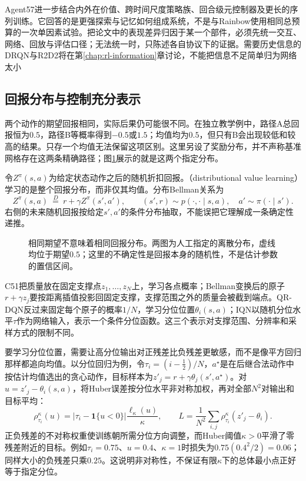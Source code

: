 Agent57进一步结合内外在价值、跨时间尺度策略族、回合级元控制器及更长的序列训练。它回答的是更强探索与记忆如何组成系统，不是与Rainbow使用相同总预算的一次单因素试验。把论文中的表现差异归因于某一个部件，必须先统一交互、网络、回放与评估口径；无法统一时，只陈述各自协议下的证据。需要历史信息的DRQN与R2D2将在第\ref{chap:rl-information}章讨论，不能把信息不足简单归为网络太小

\subsection{回报分布与控制充分表示}
\label{sec:rl-learning-distributional}

两个动作的期望回报相同，实际后果仍可能很不同。在独立教学例中，路径A总回报恒为$0.5$，路径B等概率得到$-0.5$或$1.5$；均值均为$0.5$，但只有B会出现较低和较高的结果。只存一个均值无法保留这项区别。这里另设了奖励分布，并不声称基准网格存在这两条精确路径；图\ref{fig:rl-learning-return-distributions}展示的就是这两个指定分布。

令$Z^\pi(s,a)$为给定状态动作之后的随机折扣回报。（distributional value learning）学习的是整个回报分布，而非仅其均值。分布Bellman关系为
\begin{equation}
  Z^\pi(s,a)\ \overset{D}{=}\ %
    r+\gamma Z^\pi(s',a'),\qquad
  (s',r)\sim p(\cdot,\cdot\mid s,a),\quad a'\sim\pi(\cdot\mid s').
  \label{eq:rl-learning-distributional-bellman}
\end{equation}
右侧的未来随机回报按给定$s',a'$的条件分布抽取，不能误把它理解成一条确定性递推。

\begin{figure}[htbp]
  \centering
  
  \caption{相同期望不意味着相同回报分布。两图为人工指定的离散分布，虚线均位于期望$0.5$；这里的不确定性是回报本身的随机性，不是估计参数的置信区间。}
  \label{fig:rl-learning-return-distributions}
\end{figure}

C51把质量放在固定支撑点$z_1,\ldots,z_N$上，学习各点概率；Bellman变换后的原子$r+\gamma z_j$要按距离插值投影回固定支撑，支撑范围之外的质量会被截到端点。QR-DQN反过来固定每个原子的概率$1/N$，学习分位位置$\theta_i(s,a)$；IQN以随机分位水平$\tau$作为网络输入，表示一个条件分位函数。这三个表示对支撑范围、分辨率和采样方式的限制不同。

要学习分位位置，需要让高分位输出对正残差比负残差更敏感，而不是像平方回归那样都追向均值。以分位回归为例，令$\tau_i=(i-\tfrac12)/N$，$a^\star$是在后继合法动作中按估计均值选出的贪心动作，目标样本为$z'_j=r+\gamma\theta_j(s',a^\star)$。对$u=z'_j-\theta_i(s,a)$，将Huber误差按分位水平非对称加权，再对全部$N^2$对输出和目标平均：
\[
  \rho_{\tau_i}^{\kappa}(u)
      =|\tau_i-\mathbf1\{u<0\}|\frac{\ell_\kappa(u)}{\kappa},
  \qquad
  L=\frac1{N^2}\sum_{i,j}\rho_{\tau_i}^{\kappa}(z'_j-\theta_i).
\]
正负残差的不对称权重使训练朝所需分位方向调整，而Huber阈值$\kappa>0$平滑了零残差附近的目标。例如$\tau_i=0.75$、$u=0.4$、$\kappa=1$时损失为$0.75(0.4^2/2)=0.06$；同样大小的负残差只乘$0.25$。这说明非对称性，不保证有限$\kappa$下的总体最小点正好等于指定分位。

